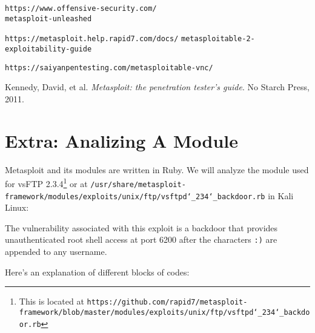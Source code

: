 \documentclass[twocolumn]{article}
\begin{document}
\begin{thebibliography}{9}

    
        \texttt{https://www.offensive-security.com/}\\
        \texttt{metasploit-unleashed}

        \texttt{https://metasploit.help.rapid7.com/docs/}
        \texttt{metasploitable-2-exploitability-guide}

        \texttt{https://saiyanpentesting.com/metasploitable-vnc/}
    
        Kennedy, David, et al. \textit{Metasploit: the penetration tester's guide}. No Starch Press, 2011.
    
    \end{thebibliography}

\cleardoublepage
\onecolumn

\section{Extra: Analizing A Module}

Metasploit and its modules are written in Ruby. We will analyze the module used for vsFTP 2.3.4\footnote{This is located at \texttt{https://github.com/rapid7/metasploit-framework/blob/master/modules/exploits/unix/ftp/vsftpd\char`\_234\char`\_backdoor.rb}} or at \texttt{/usr/share/metasploit-framework/modules/exploits/unix/ftp/vsftpd\char`\_234\char`\_backdoor.rb} in Kali Linux:



\noindent The vulnerability associated with this exploit is a backdoor that provides unauthenticated root shell access at port 6200 after the characters \texttt{:)} are appended to any username.

\noindent Here's an explanation of different blocks of codes:
\end{document}
